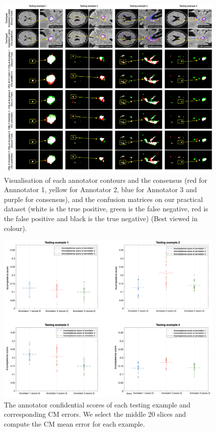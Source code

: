 \begin{figure}
        \center
        \includegraphics[width=\linewidth]{chapter_8/picture95.png}
        \caption{Visualisation of each annotator contours and the consensus (red for Annnotator 1, yellow for Annotator 2, blue for Annotator 3 and purple for consensus), and the confusion matrices on our practical dataset (white is the true positive, green is the false negative, red is the false positive and black is the true negative) (Best viewed in colour). }
        \label{consensus&CM}
\end{figure}

\begin{figure}
        \center
        \includegraphics[width=0.75\linewidth]{chapter_8/picture96.png}
        \caption{The annotator confidential scores of each testing example and corresponding CM errors. We select the middle 20 slices and compute the CM mean error for each example.}
        \label{consensus&CM}
\end{figure}


